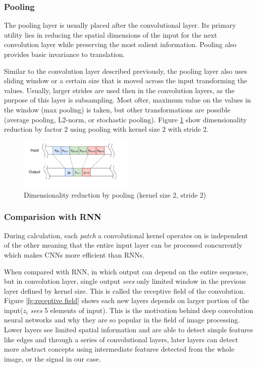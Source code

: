 \documentclass[times, utf8, diplomski, numeric, english]{fer}
\begin{document}
\subsubsection{Pooling}

The pooling layer is usually placed after the convolutional layer. Its primary utility lies in reducing the spatial dimensions of the input for the next convolution layer while preserving the most salient information. Pooling also provides basic invariance to translation.

Similar to the convolution layer described previously, the pooling layer also uses sliding window or a certain size that is moved across the input transforming the values. Usually, larger strides are used then in the convolution layers, as the purpose of this layer is subsampling. Most ofter, maximum value on the values in the window (max pooling) is taken, but other transformations are possible (average pooling, L2-norm, or stochastic pooling).
Figure \ref{fg:pooling} show dimensionality reduction by factor 2 using pooling with kernel size 2 with stride 2.
\begin{figure}[!htb]
	\begin{center}
		\includegraphics[width=0.5\textwidth]{./imgs/pooling.png}
		\caption{Dimensionality reduction by pooling (kernel size 2, stride 2)}
		\label{fg:pooling}
	\end{center}
\end{figure}




  
\subsubsection{Comparision with RNN}


During calculation, each \textit{patch} a convolutional kernel operates on is independent of the other meaning that the entire input layer can be processed concurrently which makes CNNs more efficient than RNNs. 

When compared with RNN, in which output can depend on the entire sequence, but in convolution layer, single output \textit{sees} only limited window in the previous layer defined by kernel size. This is called the receptive field of the convolution. 
Figure \ref{fg:receptive field} shows each new layers depends on larger portion of the input($z_i$ \textit{sees} 5 elements of input). 
This is the motivation behind deep convolution neural networks and why they are so popular in the field of image processing. Lower layers see limited spatial information and are able to detect simple features like edges and through a series of convolutional layers, later layers can detect more abstract concepts using intermediate features detected from the whole image, or the signal in our case.
\end{document}
